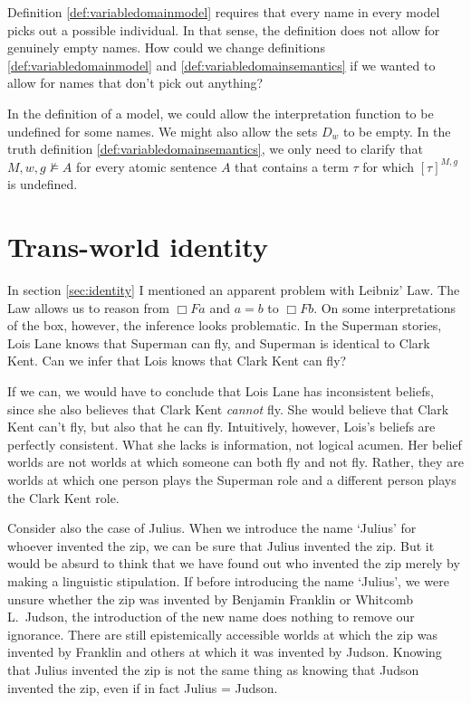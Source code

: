 \begin{exercise}
  Definition \ref{def:variabledomainmodel} requires that every name in every
  model picks out a possible individual. In that sense, the definition does not
  allow for genuinely empty names. How could we change definitions
  \ref{def:variabledomainmodel} and \ref{def:variabledomainsemantics} if we
  wanted to allow for names that don't pick out anything?
\end{exercise}
\begin{solution}
  In the definition of a model, we could allow the interpretation function to be
  undefined for some names. We might also allow the sets $D_{w}$ to be empty. In
  the truth definition \ref{def:variabledomainsemantics}, we only need to
  clarify that $M,w,g \not\models A$ for every atomic sentence $A$ that contains a
  term $\tau$ for which $[\tau]^{M,g}$ is undefined.
\end{solution}

\section{Trans-world identity}\label{sec:twi}

In section \ref{sec:identity} I mentioned an apparent problem with Leibniz' Law.
The Law allows us to reason from $\Box Fa$ and $a\!=\!b$ to $\Box Fb$. On some
interpretations of the box, however, the inference looks problematic. In the
Superman stories, Lois Lane knows that Superman can fly, and Superman is
identical to Clark Kent. Can we infer that Lois knows that Clark Kent can fly?

If we can, we would have to conclude that Lois Lane has inconsistent beliefs,
since she also believes that Clark Kent \emph{cannot} fly. She would believe
that Clark Kent can't fly, but also that he can fly. Intuitively, however,
Lois's beliefs are perfectly consistent. What she lacks is information, not
logical acumen. Her belief worlds are not worlds at which someone can both fly
and not fly. Rather, they are worlds at which one person plays the Superman role
and a different person plays the Clark Kent role.

Consider also the case of Julius. When we introduce the name `Julius' for
whoever invented the zip, we can be sure that Julius invented the zip. But it
would be absurd to think that we have found out who invented the zip merely by
making a linguistic stipulation. If before introducing the name `Julius', we
were unsure whether the zip was invented by Benjamin Franklin or Whitcomb L.\
Judson, the introduction of the new name does nothing to remove our ignorance.
There are still epistemically accessible worlds at which the zip was invented by
Franklin and others at which it was invented by Judson. Knowing that Julius
invented the zip is not the same thing as knowing that Judson invented the zip,
even if in fact Julius = Judson.

